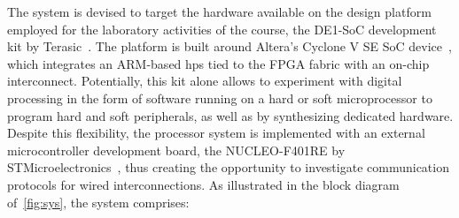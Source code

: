 \documentclass[]{article}
\begin{document}
The system is devised to target the hardware available on the design platform employed for the laboratory activities of the course, the DE1-SoC development kit by Terasic~\cite{de1soc}. The platform is built around Altera's Cyclone V SE SoC device~\cite{cyclone}, which integrates an ARM-based \ac{hps} tied to the FPGA fabric with an on-chip interconnect.
Potentially, this kit alone allows to experiment with digital processing in the form of software running on a hard or soft microprocessor to program hard and soft peripherals, as well as by synthesizing dedicated hardware. Despite this flexibility, the processor system is implemented with an external microcontroller development board, the NUCLEO-F401RE by STMicroelectronics~\cite{nucleo}, thus creating the opportunity to investigate communication protocols for wired interconnections.
As illustrated in the block diagram of~\cref{fig:sys}, the system comprises:
\end{document}

